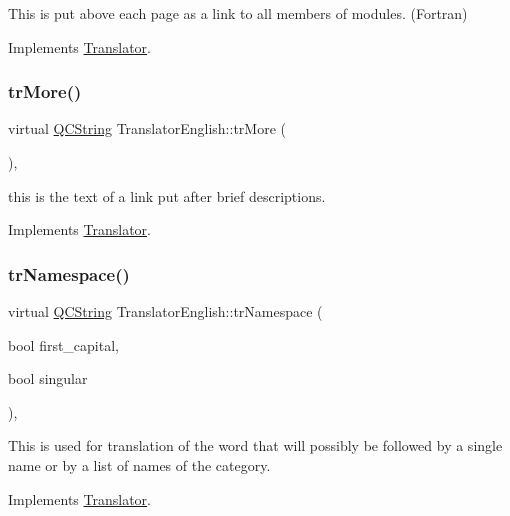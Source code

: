 This is put above each page as a link to all members of modules. (Fortran) 

Implements \mbox{\hyperlink{class_translator}{Translator}}.

\mbox{\label{class_translator_english_a14f9cd78e240748a9c92e64aff140ebc}} 
\subsubsection{\texorpdfstring{trMore()}{trMore()}}
{\footnotesize\ttfamily virtual \mbox{\hyperlink{class_q_c_string}{Q\+C\+String}} Translator\+English\+::tr\+More (\begin{DoxyParamCaption}{ }\end{DoxyParamCaption})\hspace{0.3cm}{\ttfamily [inline]}, {\ttfamily [virtual]}}

this is the text of a link put after brief descriptions. 

Implements \mbox{\hyperlink{class_translator}{Translator}}.

\mbox{\label{class_translator_english_a3930ebeba121ab79c02b8146c4989658}} 
\subsubsection{\texorpdfstring{trNamespace()}{trNamespace()}}
{\footnotesize\ttfamily virtual \mbox{\hyperlink{class_q_c_string}{Q\+C\+String}} Translator\+English\+::tr\+Namespace (\begin{DoxyParamCaption}\item[{bool}]{first\+\_\+capital,  }\item[{bool}]{singular }\end{DoxyParamCaption})\hspace{0.3cm}{\ttfamily [inline]}, {\ttfamily [virtual]}}

This is used for translation of the word that will possibly be followed by a single name or by a list of names of the category. 

Implements \mbox{\hyperlink{class_translator}{Translator}}.

\mbox{\label{class_translator_english_a1ee1746806ab05ed43f7868822f215bf}} 
